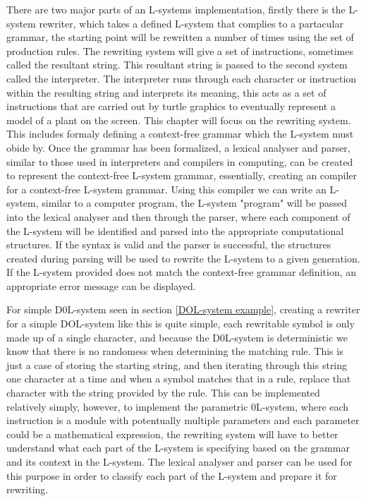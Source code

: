 
\begin{flushleft}

There are two major parts of an L-systems implementation, firstly there is the L-system rewriter, which takes a defined L-system that complies to a partacular grammar, the starting point will be rewritten a number of times using the set of production rules. The rewriting system will give a set of instructions, sometimes called the resultant string. This resultant string is passed to the second system called the interpreter. The interpreter runs through each character or instruction within the resulting string  and interprets its meaning, this acts as a set of instructions that are carried out by turtle graphics to eventually represent a model of a plant on the screen. This chapter will focus on the rewriting system. This includes formaly defining a context-free grammar which the L-system must obide by. Once the grammar has been formalized, a lexical analyser and parser, similar to those used in interpreters and compilers in computing, can be created to represent the context-free L-system grammar, essentially, creating an compiler for a context-free L-system grammar. Using this compiler we can write an L-system, similar to a computer program, the L-system "program" will be passed into the lexical analyser and then through the parser, where each component of the L-system will be identified and parsed into the appropriate computational structures. If the syntax is valid and the parser is successful, the structures created during parsing will be used to rewrite the L-system to a given generation. If the L-system provided does not match the context-free grammar definition, an appropriate error message can be displayed. \\

\vspace{5mm}

For simple D0L-system seen in section \ref{DOL-system example}, creating a rewriter for a simple DOL-system like this is quite simple, each rewritable symbol is only made up of a single character, and because the D0L-system is deterministic we know that there is no randomess when determining the matching rule. This is just a case of storing the starting string, and then iterating through this string one character at a time and when a symbol matches that in a rule, replace that character with the string provided by the rule. This can be implemented relatively simply, however, to implement the parametric 0L-system, where each instruction is a module with potentually multiple parameters and each parameter could be a mathematical expression, the rewriting system will have to better understand what each part of the L-system is specifying based on the grammar and its context in the L-system. The lexical analyser and parser can be used for this purpose in order to classify each part of the L-system and prepare it for rewriting. \\


\end{flushleft}
